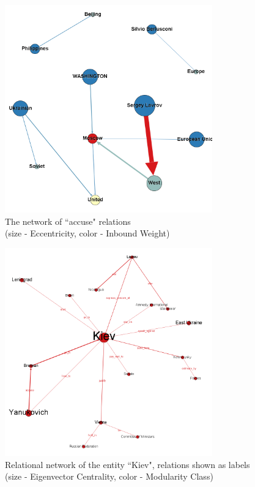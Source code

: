 \documentclass[]{article}
\begin{document}
\begin{figure}[htbp]
  \centering
    \includegraphics[width=0.8\textwidth]{images/Accusations}
    \captionsetup{justification=centering}
    \caption{The network of ``accuse" relations \\ (size - Eccentricity, color - Inbound Weight)}
  \label{Accusations}
\end{figure}
\begin{figure}[htbp]
  \centering
    \includegraphics[width=0.8\textwidth]{images/KievNetwork}
    \captionsetup{justification=centering}
    \caption{Relational network of the entity ``Kiev", relations shown as labels (size - Eigenvector Centrality, color - Modularity Class)}
  \label{KievNetwork}
\end{figure}
\end{document}
